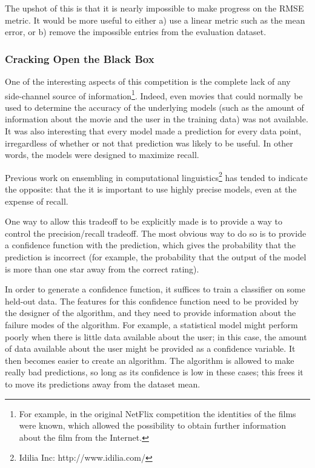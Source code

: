 \documentclass{article}
\begin{document}
The upshot of this is that it is nearly impossible to make progress on the RMSE metric.  It would be more useful to either a) use a linear metric such as the mean error, or b) remove the impossible entries from the evaluation dataset.

\subsubsection{Cracking Open the Black Box}

One of the interesting aspects of this competition is the complete lack of any
side-channel source of information\footnote{For example, in the original NetFlix
competition the identities of the films were known, which allowed the
possibility to obtain further information about the film from the Internet.}.  Indeed, even movies that could normally be used to determine the accuracy of the underlying models (such as the amount of information about the movie and the user in the training data) was not available.  It was also interesting that every model made a prediction for every data point, irregardless of whether or not that prediction was likely to be useful.  In other words, the models were designed to maximize recall.

Previous work on ensembling in computational linguistics\footnote{Idilia Inc: http://www.idilia.com/} has tended to indicate the opposite: that the it is important to use highly precise models, even at the expense of recall.

One way to allow this tradeoff to be explicitly made is to provide a way to control the precision/recall tradeoff.  The most obvious way to do so is to provide a confidence function with the prediction, which gives the probability that the prediction is incorrect (for example, the probability that the output of the model is more than one star away from the correct rating).

In order to generate a confidence function, it suffices to train a classifier on some held-out data.  The features for this confidence function need to be provided by the designer of the algorithm, and they need to provide information about the failure modes of the algorithm.  For example, a statistical model might perform poorly when there is little data available about the user; in this case, the amount of data available about the user might be provided as a confidence variable.  It then becomes easier to create an algorithm.  The algorithm is allowed to make really bad predictions, so long as its confidence is low in these cases; this frees it to move its predictions away from the dataset mean.
\end{document}
